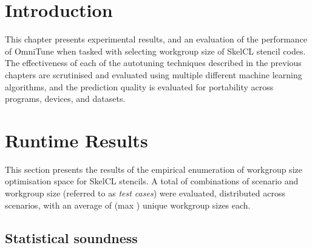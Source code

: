 \section{Introduction}

This chapter presents experimental results, and an evaluation of the
performance of OmniTune when tasked with selecting workgroup size of
SkelCL stencil codes. The effectiveness of each of the autotuning
techniques described in the previous chapters are scrutinised and
evaluated using multiple different machine learning algorithms, and
the prediction quality is evaluated for portability across programs,
devices, and datasets.


%


\section{Runtime Results}

This section presents the results of the empirical enumeration of
workgroup size optimisation space for SkelCL stencils. A total of
 combinations of scenario and workgroup
size (referred to as \emph{test cases}) were evaluated, distributed
across  scenarios, with an average of
 (max ) unique
workgroup sizes each.

\subsection{Statistical soundness}

